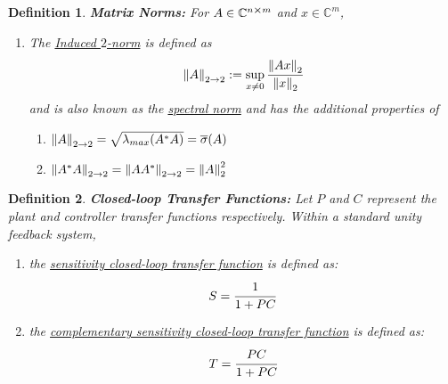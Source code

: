 \documentclass[letter]{article}
\numberwithin{equation}{section}
\newcommand{\C}{\mathbb{C}}
\newtheorem{definition}{Definition}
\begin{document}
\begin{definition}
    \textbf{Matrix Norms:}
    For $A \in \C^{n \cross m}$ and $x \in \C^{m}$, \begin{enumerate}
        \item The \emph{\underline{Induced $2$-norm}} is defined as \[
            \norm{A}_{2\to2} := \sup_{x \neq 0} \cfrac{\norm{A x}_2}{\norm{x}_2}
        \] and is also known as the \emph{\underline{spectral norm}} and has the additional properties of \begin{enumerate}
            \item $\norm{A}_{2\to2} = \sqrt{\lambda_{max}(A^* A)} = \overline{\sigma}(A)$
            \item $\norm{A^*A}_{2\to2} = \norm{A A^*}_{2\to2} = \norm{A}_2^2$
        \end{enumerate}
    \end{enumerate}
\end{definition}


\begin{definition}
    \textbf{Closed-loop Transfer Functions:} 
    Let $P$ and $C$ represent the plant and controller transfer functions respectively. 
    Within a standard unity feedback system, \begin{enumerate}
        \item the \underline{\emph{sensitivity closed-loop transfer function}} is defined as:\[
            S = \cfrac{1}{1+PC}
        \] 
        \item the \underline{\emph{complementary sensitivity closed-loop transfer function}} is defined as:\[
            T = \cfrac{PC}{1+PC}
        \]
    \end{enumerate}
\end{definition}
\end{document}
